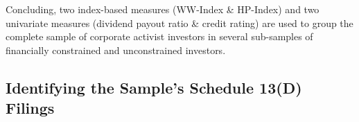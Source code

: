 \documentclass[12pt]{article}
\begin{document}
Concluding, two index-based measures (WW-Index \& HP-Index) and two univariate measures (dividend payout ratio \& credit rating) are used to group the complete sample of corporate activist investors in several sub-samples of financially constrained and unconstrained investors.
\subsection{Identifying the Sample's Schedule 13(D) Filings}
\end{document}
